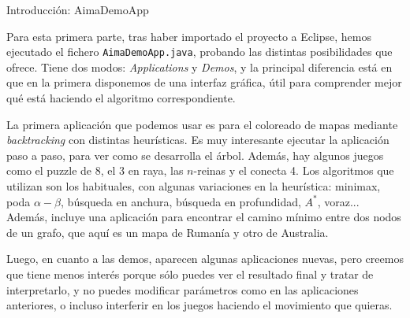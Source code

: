 \documentclass[11pt, a4paper, spanish, openright, twoside]{book}
\begin{document}
\begin{section}{Introducción: AimaDemoApp}

Para esta primera parte, tras haber importado el proyecto a Eclipse, hemos ejecutado el fichero \texttt{AimaDemoApp.java}, probando las distintas posibilidades que ofrece. Tiene dos modos: \textit{Applications} y \textit{Demos}, y la principal diferencia está en que en la primera disponemos de una interfaz gráfica, útil para comprender mejor qué está haciendo el algoritmo correspondiente. 

La primera aplicación que podemos usar es para el coloreado de mapas mediante \textit{backtracking} con distintas heurísticas. Es muy interesante ejecutar la aplicación paso a paso, para ver como se desarrolla el árbol. Además, hay algunos juegos como el puzzle de 8, el 3 en raya, las $n$-reinas y el conecta 4. Los algoritmos que utilizan son los habituales, con algunas variaciones en la heurística: minimax, poda $\alpha-\beta$, búsqueda en anchura, búsqueda en profundidad, $A^*$, voraz... Además, incluye una aplicación para encontrar el camino mínimo entre dos nodos de un grafo, que aquí es un mapa de Rumanía y otro de Australia. 

Luego, en cuanto a las demos, aparecen algunas aplicaciones nuevas, pero creemos que tiene menos interés porque sólo puedes ver el resultado final y tratar de interpretarlo, y no puedes modificar parámetros como en las aplicaciones anteriores, o incluso interferir en los juegos haciendo el movimiento que quieras. 


\end{section}
\end{document}
